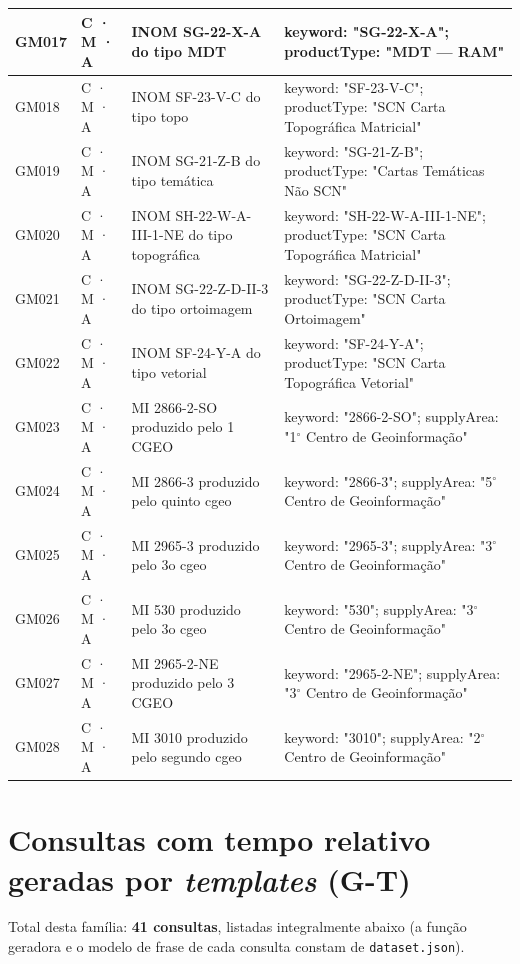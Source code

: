 {\begin{longtable}{|p{1.1cm}|p{1.3cm}|p{5.4cm}|p{6.3cm}|}
GM017 & C · M · A & INOM SG-22-X-A do tipo MDT & keyword: "SG-22-X-A"; productType: "MDT — RAM" \\ \hline
GM018 & C · M · A & INOM SF-23-V-C do tipo topo & keyword: "SF-23-V-C"; productType: "SCN Carta Topográfica Matricial" \\ \hline
GM019 & C · M · A & INOM SG-21-Z-B do tipo temática & keyword: "SG-21-Z-B"; productType: "Cartas Temáticas Não SCN" \\ \hline
GM020 & C · M · A & INOM SH-22-W-A-III-1-NE do tipo topográfica & keyword: "SH-22-W-A-III-1-NE"; productType: "SCN Carta Topográfica Matricial" \\ \hline
GM021 & C · M · A & INOM SG-22-Z-D-II-3 do tipo ortoimagem & keyword: "SG-22-Z-D-II-3"; productType: "SCN Carta Ortoimagem" \\ \hline
GM022 & C · M · A & INOM SF-24-Y-A do tipo vetorial & keyword: "SF-24-Y-A"; productType: "SCN Carta Topográfica Vetorial" \\ \hline
GM023 & C · M · A & MI 2866-2-SO produzido pelo 1 CGEO & keyword: "2866-2-SO"; supplyArea: "1$^\circ$ Centro de Geoinformação" \\ \hline
GM024 & C · M · A & MI 2866-3 produzido pelo quinto cgeo & keyword: "2866-3"; supplyArea: "5$^\circ$ Centro de Geoinformação" \\ \hline
GM025 & C · M · A & MI 2965-3 produzido pelo 3o cgeo & keyword: "2965-3"; supplyArea: "3$^\circ$ Centro de Geoinformação" \\ \hline
GM026 & C · M · A & MI 530 produzido pelo 3o cgeo & keyword: "530"; supplyArea: "3$^\circ$ Centro de Geoinformação" \\ \hline
GM027 & C · M · A & MI 2965-2-NE produzido pelo 3 CGEO & keyword: "2965-2-NE"; supplyArea: "3$^\circ$ Centro de Geoinformação" \\ \hline
GM028 & C · M · A & MI 3010 produzido pelo segundo cgeo & keyword: "3010"; supplyArea: "2$^\circ$ Centro de Geoinformação" \\ \hline
\end{longtable}
\addtocounter{table}{-1}
}

\section{Consultas com tempo relativo geradas por \textit{templates} (G-T)}

Total desta fam\'ilia: \textbf{41 consultas}, listadas integralmente abaixo (a fun\c{c}\~ao geradora e o modelo de frase de cada consulta constam de \texttt{dataset.json}).

